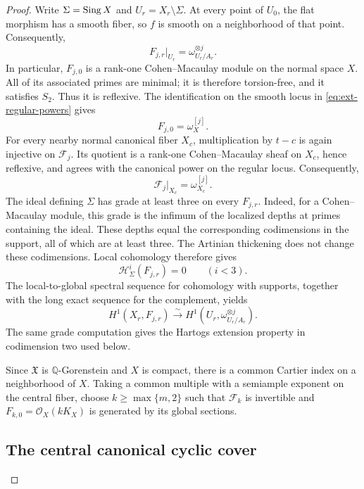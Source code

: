 \documentclass[11pt,a4paper]{article}
\theoremstyle{definition}\newtheorem{definition}[theorem]{Definition}
\theoremstyle{remark}\newtheorem*{remark}{Remark}
\newcommand{\Q}{\mathbb Q}\newcommand{\C}{\mathbb C}
\newcommand{\OO}{\mathcal O}
\newcommand{\cF}{\mathcal F}\newcommand{\cX}{\mathcal X}
\begin{document}
\begin{proof}
Write $\Sigma=\operatorname{Sing} X$ and $U_r=X_r\setminus\Sigma$.
At every point of $U_0$, the flat morphism has a smooth fiber, so $f$ is
smooth on a neighborhood of that point. Consequently,
\begin{equation}\label{eq:ext-regular-powers}
 F_{j,r}|_{U_r}=\omega_{U_r/A_r}^{\otimes j}.
\end{equation}
In particular, $F_{j,0}$ is a rank-one Cohen--Macaulay module on the normal
space $X$. All of its associated primes are minimal; it is therefore
torsion-free, and it satisfies $S_2$. Thus it is
reflexive. The identification on the smooth locus in
\eqref{eq:ext-regular-powers} gives
\begin{equation}\label{eq:ext-reflexive-restriction}
 F_{j,0}=\omega_X^{[j]}.
\end{equation}
For every nearby normal canonical fiber $X_c$, multiplication by $t-c$
is again injective on $\cF_j$. Its quotient is a rank-one
Cohen--Macaulay sheaf on $X_c$, hence reflexive, and agrees with the
canonical power on the regular locus. Consequently,
\[
 \cF_j|_{X_c}=\omega_{X_c}^{[j]}.
\]
The ideal defining $\Sigma$ has grade at least three on every $F_{j,r}$.
Indeed, for a Cohen--Macaulay module, this grade is the infimum of the
localized depths at primes containing the ideal. These depths equal the
corresponding codimensions in the support, all of which are at least three.
The Artinian thickening does not change these codimensions. Local cohomology
therefore gives
\[
 \mathcal H^i_\Sigma(F_{j,r})=0\qquad(i<3).
\]
The local-to-global spectral sequence for cohomology with supports,
together with the long exact sequence for the complement, yields
\begin{equation}\label{eq:ext-depth-base}
 H^1(X_r,F_{j,r})
 \xrightarrow{\ \sim\ }
 H^1(U_r,\omega_{U_r/A_r}^{\otimes j}).
\end{equation}
The same grade computation gives the Hartogs extension property in
codimension two used below.

Since $\mathfrak X$ is $\Q$-Gorenstein and $X$ is compact, there is a common
Cartier index on a neighborhood of $X$. Taking a common multiple with a
semiample exponent on the central fiber, choose
$k\ge\max\{m,2\}$ such that $\cF_k$ is invertible and
$F_{k,0}=\OO_X(kK_X)$ is generated by its global sections.

\subsection{The central canonical cyclic cover}


\end{proof}
\end{document}
